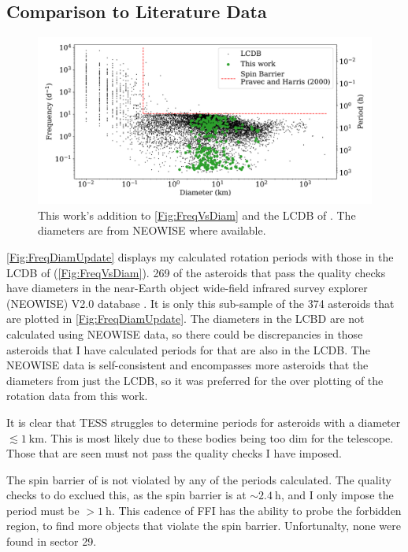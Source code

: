\documentclass{UCreport}
\begin{document}
\subsection{Comparison to Literature Data}\label{SubSec:LitComp}

\begin{figure}
  \centering
  \includegraphics[width=\textwidth]{./Figures/Diam-FreqPlotThisWork.pdf}
  \caption{This work's addition to \autoref{Fig:FreqVsDiam} and the LCDB of \citet{Warner2009}. The diameters are from NEOWISE where available.}
  \label{Fig:FreqDiamUpdate}
\end{figure}

\autoref{Fig:FreqDiamUpdate} displays my calculated rotation periods with those in the LCDB of \citet{Warner2009} (\autoref{Fig:FreqVsDiam}).
269 of the asteroids that pass the quality checks have diameters in the near-Earth object wide-field infrared survey explorer (NEOWISE) V2.0 database \citep{Masiero2011, NEOWISE2019}.
It is only this sub-sample of the 374 asteroids that are plotted in \autoref{Fig:FreqDiamUpdate}.
The diameters in the LCBD are not calculated using NEOWISE data, so there could be discrepancies in those asteroids that I have calculated periods for that are also in the LCDB.
The NEOWISE data is self-consistent and encompasses more asteroids that the diameters from just the LCDB, so it was preferred for the over plotting of the rotation data from this work.

It is clear that TESS struggles to determine periods for asteroids with a diameter $\lesssim \qty{1}{\kilo \metre}$.
This is most likely due to these bodies being too dim for the telescope.
Those that are seen must not pass the quality checks I have imposed.

The spin barrier of \citet{Pravec2000} is not violated by any of the periods calculated.
The quality checks to do exclued this, as the spin barrier is at $\sim \qty{2.4}{\hour}$, and I only impose the period must be $>\qty{1}{\hour}$.
This cadence of FFI has the ability to probe the forbidden region, to find more objects that violate the spin barrier.
Unfortunalty, none were found in sector 29.
\end{document}
